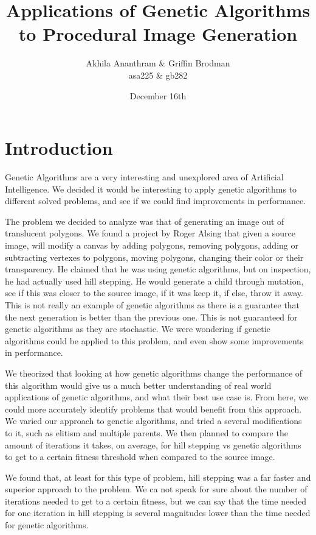\documentclass[12pt,letterpaper]{article}
\author{Akhila Ananthram $\&$ Griffin Brodman\\asa225 $\&$ gb282}
\title{Applications of Genetic Algorithms to Procedural Image Generation }
\date{December 16th}
\begin{document}
\maketitle
\section{Introduction}
Genetic Algorithms are a very interesting and unexplored area of Artificial Intelligence. We decided it would be interesting to apply genetic algorithms to different solved problems, and see if we could find improvements in performance. 

The problem we decided to analyze was that of generating an image out of translucent polygons. We found a project by Roger Alsing that given a source image, will modify a canvas by adding polygons, removing polygons, adding or subtracting vertexes to polygons, moving polygons, changing their color or their transparency. He claimed that he was using genetic algorithms, but on inspection, he had actually used hill stepping. He would generate a child through mutation, see if this was closer to the source image, if it was keep it, if else, throw it away. This is not really an example of genetic algorithms as there is a guarantee that the next generation is better than the previous one. This is not guaranteed for genetic algorithms as they are stochastic.  We were wondering if genetic algorithms could be applied to this problem, and even show some improvements in performance. 

We theorized that looking at how genetic algorithms change the performance of this algorithm would give us a much better understanding of real world applications of genetic algorithms, and what their best use case is. From here, we could more accurately identify problems that would benefit from this approach. We varied our approach to genetic algorithms, and tried a several modifications to it, such as elitism and multiple parents. We then planned to compare the amount of iterations it takes, on average, for hill stepping vs genetic algorithms to get to a certain fitness threshold when compared to the source image.

We found that, at least for this type of problem, hill stepping was a far faster and superior approach to the problem. We ca not speak for sure about the number of iterations needed to get to a certain fitness, but we can say that the time needed for one iteration in hill stepping is several magnitudes lower than the time needed for genetic algorithms.
\end{document}
